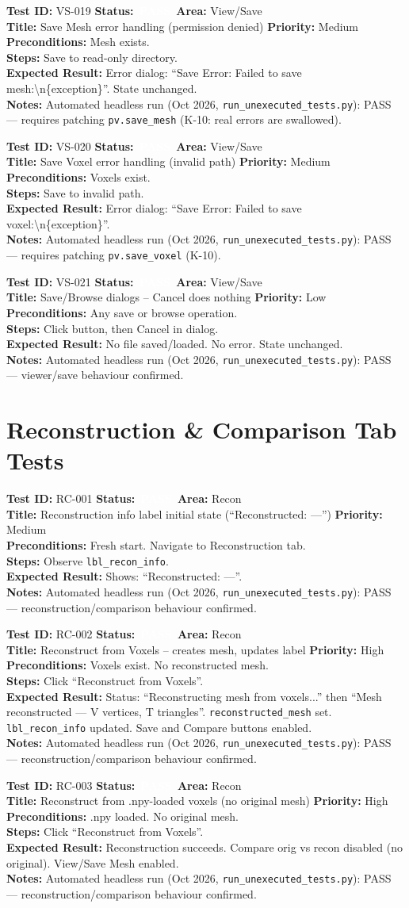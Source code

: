 \documentclass[12pt,a4paper]{article}
\newcommand{\statuspass}{\colorbox{statusgreen}{\textcolor{white}{\textbf{\,PASS\,}}}}
\newcommand{\testcase}[9]{%
  \smallskip
  \noindent\textbf{Test ID:} #1 \hfill \textbf{Status:} #2 \hfill \textbf{Area:} #3 \\
  \textbf{Title:} #4 \hfill \textbf{Priority:} #5 \\[0.3em]
  \textbf{Preconditions:} #6 \\[0.3em]
  \textbf{Steps:} #7 \\[0.3em]
  \textbf{Expected Result:} #8 \\
  \textbf{Notes:} #9
  \smallskip
}
\begin{document}
\testcase{VS-019}{\statuspass}{View/Save}{Save Mesh error handling (permission denied)}{Medium}{Mesh exists.}{Save to read-only directory.}{Error dialog: ``Save Error: Failed to save mesh:\textbackslash n\{exception\}''. State unchanged.}{Automated headless run (Oct 2026, \texttt{run\_unexecuted\_tests.py}): PASS --- requires patching \texttt{pv.save\_mesh} (K-10: real errors are swallowed).}


\testcase{VS-020}{\statuspass}{View/Save}{Save Voxel error handling (invalid path)}{Medium}{Voxels exist.}{Save to invalid path.}{Error dialog: ``Save Error: Failed to save voxel:\textbackslash n\{exception\}''.}{Automated headless run (Oct 2026, \texttt{run\_unexecuted\_tests.py}): PASS --- requires patching \texttt{pv.save\_voxel} (K-10).}


\testcase{VS-021}{\statuspass}{View/Save}{Save/Browse dialogs -- Cancel does nothing}{Low}{Any save or browse operation.}{Click button, then Cancel in dialog.}{No file saved/loaded. No error. State unchanged.}{Automated headless run (Oct 2026, \texttt{run\_unexecuted\_tests.py}): PASS --- viewer/save behaviour confirmed.}



\section{Reconstruction \& Comparison Tab Tests}

\testcase{RC-001}{\statuspass}{Recon}{Reconstruction info label initial state (``Reconstructed: ---'')}{Medium}{Fresh start. Navigate to Reconstruction tab.}{Observe \texttt{lbl\_recon\_info}.}{Shows: ``Reconstructed: ---''.}{Automated headless run (Oct 2026, \texttt{run\_unexecuted\_tests.py}): PASS --- reconstruction/comparison behaviour confirmed.}


\testcase{RC-002}{\statuspass}{Recon}{Reconstruct from Voxels -- creates mesh, updates label}{High}{Voxels exist. No reconstructed mesh.}{Click ``Reconstruct from Voxels''.}{Status: ``Reconstructing mesh from voxels...'' then ``Mesh reconstructed --- V vertices, T triangles''. \texttt{reconstructed\_mesh} set. \texttt{lbl\_recon\_info} updated. Save and Compare buttons enabled.}{Automated headless run (Oct 2026, \texttt{run\_unexecuted\_tests.py}): PASS --- reconstruction/comparison behaviour confirmed.}


\testcase{RC-003}{\statuspass}{Recon}{Reconstruct from .npy-loaded voxels (no original mesh)}{High}{.npy loaded. No original mesh.}{Click ``Reconstruct from Voxels''.}{Reconstruction succeeds. Compare orig vs recon disabled (no original). View/Save Mesh enabled.}{Automated headless run (Oct 2026, \texttt{run\_unexecuted\_tests.py}): PASS --- reconstruction/comparison behaviour confirmed.}
\end{document}
